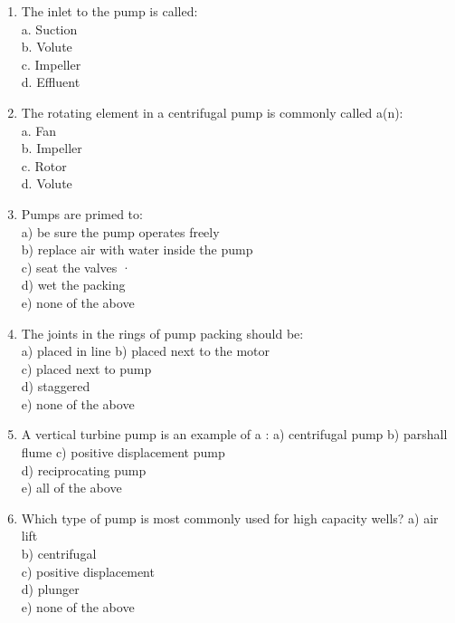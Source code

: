 \documentclass{article}
\begin{document}
\begin{enumerate}[1.]
\item The inlet to the pump is called:\\
a. Suction\\
b. Volute\\
c. Impeller\\
d. Effluent\\

\item The rotating element in a centrifugal pump is commonly called a(n):\\
a. Fan\\
b. Impeller\\
c. Rotor\\
d. Volute\\

\item Pumps are primed to:\\
a) be sure the pump operates freely\\
b) replace air with water inside the pump\\
c) seat the valves ·\\
d) wet the packing\\
e) none of the above\\

\item The joints in the rings of pump packing should be:\\
a) placed in line
b) placed next to the motor\\
c) placed next to pump\\
d) staggered\\
e) none of the above\\

\item A vertical turbine pump is an example of a :
a) centrifugal pump
b) parshall flume
c) positive displacement pump\\
d) reciprocating pump\\
e) all of the above\\

\item  Which type of pump is most commonly used for high capacity wells?
a) air lift\\
b) centrifugal\\
c) positive displacement\\
d) plunger\\
e) none of the above\\



\end{enumerate}
\end{document}
